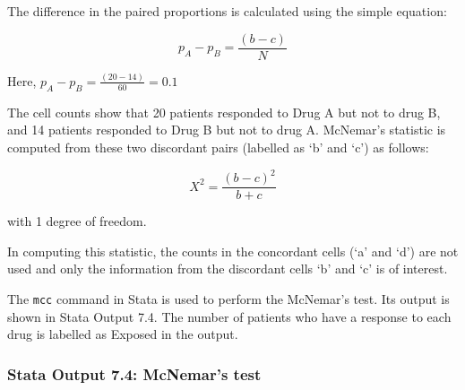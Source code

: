 \documentclass[
]{memoir}
\begin{document}
The difference in the paired proportions is calculated using the simple equation:

\[ p_{A} - p_{B} = \frac{(b - c)}{N} \]

Here, \(p_{A} - p_{B} = \frac{(20 - 14)}{60} = 0.1\)

The cell counts show that 20 patients responded to Drug A but not to drug B, and 14 patients responded to Drug B but not to drug A. McNemar's statistic is computed from these two discordant pairs (labelled as `b' and `c') as follows:

\[ X^2 = \frac{(b-c)^2}{b+c} \]

with 1 degree of freedom.

In computing this statistic, the counts in the concordant cells (`a' and `d') are not used and only the information from the discordant cells `b' and `c' is of interest.

The \texttt{mcc} command in Stata is used to perform the McNemar's test. Its output is shown in Stata Output 7.4. The number of patients who have a response to each drug is labelled as Exposed in the output.

\hypertarget{stata-output-7.4-mcnemars-test}{%
\subsubsection*{Stata Output 7.4: McNemar's test}\label{stata-output-7.4-mcnemars-test}}
\end{document}
